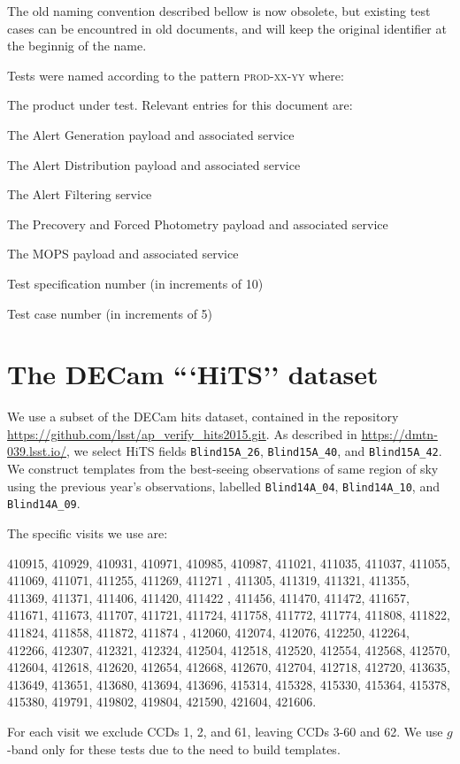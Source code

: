 \documentclass[DM,lsstdraft,STS,toc]{lsstdoc}
\begin{document}
The old naming convention described bellow is now obsolete, but existing test cases can be encountred in old documents, and will keep the original identifier at the beginnig of the name.

Tests were named according to the pattern \textsc{prod-xx-yy} where:

\begin{description}[font=\normalfont\scshape]

  \item[prod]{The product under test. Relevant entries for this document are:
    \begin{description}[font=\normalfont\scshape,topsep=-1.0ex]
      \item[AG]{The Alert Generation payload and associated service}
      \item[AD]{The Alert Distribution payload and associated service}
      \item[AF]{The Alert Filtering service}
      \item[PFP]{The Precovery and Forced Photometry payload and associated
	      service}
      \item[MOPS]{The MOPS payload and associated service}
    \end{description}
  }
  \item[xx]{Test specification number (in increments of 10)}
  \item[yy]{Test case number (in increments of 5)}

\end{description}





\section{The DECam ```HiTS'' dataset}

We use a subset of the DECam hits dataset, contained in the repository
\url{https://github.com/lsst/ap\_verify\_hits2015.git}.  As described in
\url{https://dmtn-039.lsst.io/}, we select HiTS fields \texttt{Blind15A\_26},
\texttt{Blind15A\_40}, and \texttt{Blind15A\_42}. We construct templates from the best-seeing observations of
same region of sky using the previous year's observations, labelled
\texttt{Blind14A\_04}, \texttt{Blind14A\_10}, and \texttt{Blind14A\_09}.

The specific visits we use are:

410915, 410929, 410931, 410971, 410985, 410987, 411021, 411035,
        411037, 411055, 411069, 411071, 411255, 411269, 411271 , 411305,
        411319, 411321, 411355, 411369, 411371, 411406, 411420, 411422 ,
        411456, 411470, 411472, 411657, 411671, 411673, 411707, 411721, 411724,
        411758, 411772, 411774, 411808, 411822, 411824, 411858, 411872,
        411874 , 412060, 412074, 412076, 412250, 412264, 412266, 412307,
        412321, 412324, 412504, 412518, 412520, 412554, 412568, 412570, 412604,
        412618, 412620, 412654, 412668, 412670, 412704, 412718, 412720, 413635,
        413649, 413651, 413680, 413694, 413696, 415314, 415328, 415330, 415364,
        415378, 415380, 419791, 419802, 419804, 421590, 421604, 421606.

For each visit we exclude CCDs 1, 2, and 61, leaving CCDs 3-60 and 62.  We use $g$-band only for these tests due to the need to build templates.
\end{document}
